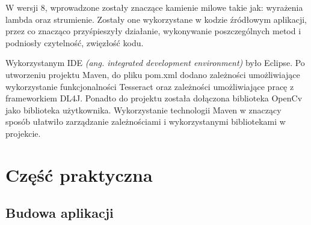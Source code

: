 \documentclass[a4paper,12pt]{article}
\begin{document}
		\par W wersji 8, wprowadzone zostały znaczące kamienie milowe takie jak: wyrażenia lambda oraz strumienie. Zostały one wykorzystane 
			w kodzie źródłowym aplikacji, przez co znacząco przyśpieszyły działanie, wykonywanie poszczególnych metod i podniosły czytelność, zwięzłość kodu. 
        
		\par Wykorzystanym IDE \textit{(ang. integrated development environment)} było Eclipse. Po utworzeniu projektu Maven, do pliku pom.xml 
			dodano zależności umożliwiające wykorzystanie funkcjonalności Tesseract oraz zależności umożliwiające pracę z frameworkiem DL4J. 
			Ponadto do projektu została dołączona biblioteka OpenCv jako biblioteka użytkownika. Wykorzystanie technologii Maven 
			w znaczący sposób ułatwiło zarządzanie zależnościami i wykorzystanymi bibliotekami w projekcie.
        \newpage
        
\section{Część praktyczna}
	\subsection{Budowa aplikacji}
\end{document}
